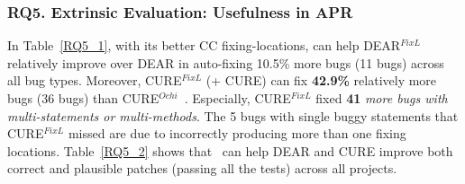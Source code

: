 \subsubsection{\bf RQ5. Extrinsic Evaluation: Usefulness in APR}
In Table~\ref{RQ5_1}, with its better CC fixing-locations, {\tool} can
help DEAR$^{FixL}$ relatively improve over DEAR in auto-fixing 10.5\%
more bugs (11 bugs) across all bug types.
Moreover, CURE$^{FixL}$ ({\tool}+ CURE) can fix {\bf 42.9\%} relatively more bugs (36 bugs) than CURE$^{Ochi}$~\cite{icse22}. 
Especially, CURE$^{FixL}$ fixed {\bf 41} {\em more bugs
with multi-statements or multi-methods}. 
The 5 bugs with
single buggy statements that CURE$^{FixL}$ missed are due to {\tool}
incorrectly producing more than one fixing locations.
Table~\ref{RQ5_2} shows that~{\tool} can help DEAR and CURE improve
both correct and plausible patches (passing all the tests) across all
projects.




